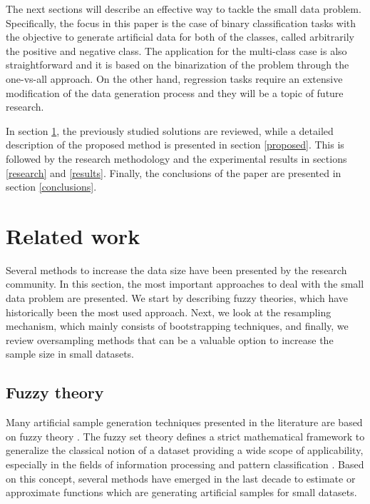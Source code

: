 The next sections will describe an effective way to tackle the small data
problem. Specifically, the focus in this paper is the case of binary classification tasks with the objective to generate artificial data for both of the classes, called arbitrarily the positive and negative class. The application for the multi-class case is also straightforward and it is based on the binarization of the problem through the one-vs-all approach. On the other hand, regression tasks require an extensive modification of the data generation process and they will be a topic of future research. 

In section \ref{related}, the previously studied solutions are reviewed, while a detailed description of the proposed method is presented in section \ref{proposed}. This is followed by the research methodology and the experimental results in sections \ref{research} and \ref{results}. Finally, the conclusions of the paper are presented in section \ref{conclusions}.

\section{Related work}
\label{related}

Several methods to increase the data size have been presented by the research community. In this section, the most important approaches to deal with the small data problem are presented. We start by describing fuzzy theories, which have historically been the most used approach. Next, we look at the resampling mechanism, which mainly consists of bootstrapping techniques, and finally, we review oversampling methods that can be a valuable option to increase the sample size in small datasets.

\subsection{Fuzzy theory}

Many artificial sample generation techniques presented in the literature are based on fuzzy theory \cite{AbdulLateh.2017}. The fuzzy set theory defines a strict mathematical framework to generalize the classical notion of a dataset providing a wide scope of applicability, especially in the fields of information processing and pattern classification \cite{Zimmermann.2010}. Based on this concept, several methods have emerged in the last decade to estimate or approximate functions which are generating artificial samples for small datasets.

